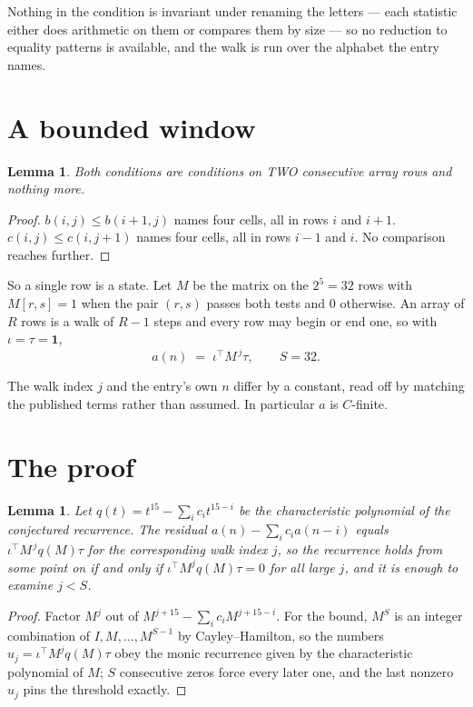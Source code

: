 \documentclass[11pt,a4paper]{article}
\theoremstyle{plain}
\newtheorem{lemma}[theorem]{Lemma}
\theoremstyle{definition}
\begin{document}
Nothing in the condition is invariant under renaming the letters --- each statistic either does
arithmetic on them or compares them by size --- so no reduction to equality patterns is
available, and the walk is run over the alphabet the entry names.

\section{A bounded window}

\begin{lemma}\label{lem:win}
Both conditions are conditions on TWO consecutive array rows and nothing more.
\end{lemma}

\begin{proof}
$b(i,j)\le b(i{+}1,j)$ names four cells, all in rows $i$ and $i+1$. $c(i,j)\le c(i,j{+}1)$
names four cells, all in rows $i-1$ and $i$. No comparison reaches further.
\end{proof}

So a single row is a state. Let $M$ be the matrix on the $2^{5}=32$ rows with
$M[r,s]=1$ when the pair $(r,s)$ passes both tests and $0$ otherwise. An array of $R$ rows is a
walk of $R-1$ steps and every row may begin or end one, so with $\iota=\tau=\mathbf{1}$,
\[
a(n)\;=\;\iota^{\!\top}M^{\,j}\tau ,\qquad S=32.
\]

The walk index $j$ and the entry's own $n$ differ by a constant, read off by matching the
published terms rather than assumed. In particular $a$ is $C$-finite.

\section{The proof}

\begin{lemma}\label{lem:crit}
Let $q(t)=t^{15}-\sum_i c_it^{15-i}$ be the characteristic polynomial of the
conjectured recurrence. The residual $a(n)-\sum_ic_ia(n-i)$ equals
$\iota^{\!\top}M^{\,j}q(M)\tau$ for the corresponding walk index $j$, so the recurrence
holds from some point on if and only if $\iota^{\!\top}M^{j}q(M)\tau=0$ for all large $j$,
and it is enough to examine $j<S$.
\end{lemma}

\begin{proof}
Factor $M^{j}$ out of $M^{j+15}-\sum_ic_iM^{j+15-i}$. For the bound, $M^{S}$
is an integer combination of $I,M,\dots,M^{S-1}$ by Cayley--Hamilton, so the numbers
$u_j=\iota^{\!\top}M^{j}q(M)\tau$ obey the monic recurrence given by the characteristic
polynomial of $M$; $S$ consecutive zeros force every later one, and the last nonzero $u_j$
pins the threshold exactly.
\end{proof}
\end{document}
